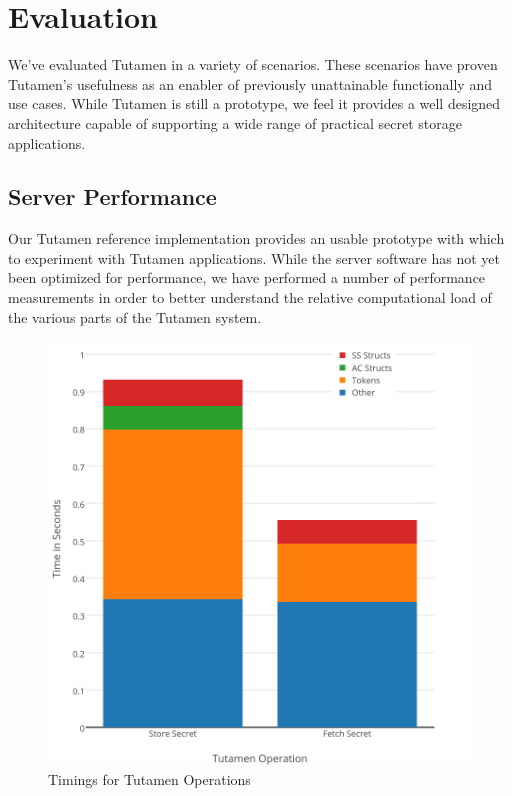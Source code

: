\section{Evaluation}
\label{sec:eval}

We've evaluated Tutamen in a variety of scenarios. These scenarios
have proven Tutamen's usefulness as an enabler of previously
unattainable functionally and use cases. While Tutamen is still a
prototype, we feel it provides a well designed architecture capable of
supporting a wide range of practical secret storage applications.

\subsection{Server Performance}

Our Tutamen reference implementation provides an usable prototype with
which to experiment with Tutamen applications. While the server
software has not yet been optimized for performance, we have performed
a number of performance measurements in order to better understand the
relative computational load of the various parts of the Tutamen system.

\begin{figure}[th]
  \centering
  \includegraphics[width=\columnwidth]{./figs/png/chart-combined-timings.png}
  \caption{Timings for Tutamen Operations}
  \label{fig:eval:timings}
\end{figure}

